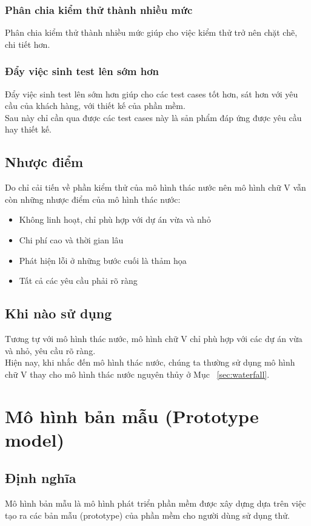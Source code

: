 \documentclass[14pt]{extarticle}
\begin{document}
\subsubsection*{Phân chia kiểm thử thành nhiều mức}
Phân chia kiểm thử thành nhiều mức giúp cho việc kiểm thử trở nên chặt chẽ,
chi tiết hơn.
\subsubsection*{Đẩy việc sinh test lên sớm hơn}
Đẩy việc sinh test lên sớm hơn giúp cho các test cases tốt hơn, sát hơn với
yêu cầu của khách hàng, với thiết kế của phần mềm.\\
Sau này chỉ cần qua được các test cases này là sản phẩm đáp ứng được yêu cầu hay
thiết kế.\\
\subsection{Nhược điểm}
Do chỉ cải tiến về phần kiểm thử của mô hình thác nước nên mô hình chữ V
vẫn còn những nhược điểm của mô hình thác nước:
\begin{itemize}
\item {Không linh hoạt, chỉ phù hợp với dự án vừa và nhỏ}
\item{Chi phí cao và thời gian lâu}
\item{Phát hiện lỗi ở những bước cuối là thảm họa}
\item{Tất cả các yêu cầu phải rõ ràng}
\end {itemize}
\subsection{Khi nào sử dụng}
Tương tự với mô hình thác nước, mô hình chữ V chỉ phù hợp với các dự án vừa và nhỏ,
yêu cầu rõ ràng.\\

Hiện nay, khi nhắc đến mô hình thác nước, chúng ta thường sử dụng mô hình chữ V
thay cho mô hình thác nước nguyên thủy ở Mục ~\ref{sec:waterfall}.

\newpage
\section{Mô hình bản mẫu (Prototype model)}
\subsection{Định nghĩa}
Mô hình bản mẫu là mô hình phát triển phần mềm được xây dựng
dựa trên việc tạo ra các bản mẫu (prototype) của phần mềm cho người dùng
sử dụng thử.\\
\end{document}
